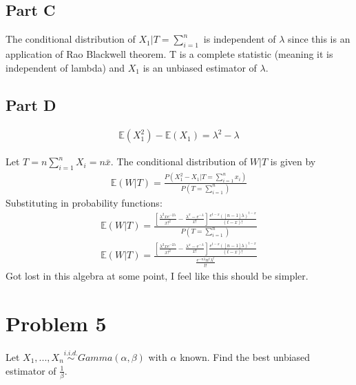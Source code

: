 \documentclass{article}
\begin{document}
\subsection*{Part C}
The conditional distribution of $X_1|T=\sum_{i=1}^{n}$ is independent of $\lambda$ since this is an application of Rao Blackwell theorem. T is a complete statistic (meaning it is independent of lambda) and $X_1$ is an unbiased estimator of $\lambda$.

\subsection*{Part D}
\begin{align*}
\mathbb{E}(X_1^2) - \mathbb{E}(X_1) = \lambda^2 - \lambda
\end{align*}

Let $T=n\sum_{i=1}^{n}X_i=n\bar{x}$. The conditional distribution of $W|T$ is given by
\begin{align*}
\mathbb{E}(W|T) = \frac{P(X_1^2-X_1|T = \sum_{i=1}^{n} x_i)}{P(T=\sum_{i=1}^{n})}
\end{align*}
Substituting in probability functions:
\begin{align*}
\mathbb{E}(W|T) = \frac{[\frac{\lambda^2x e^{-2\lambda}}{x!^2} - \frac{\lambda^x-e^{-\lambda}}{x!}] \frac{e^{t-x}([n-1]\lambda)^{t-x}}{(t-x)!}}{P(T=\sum_{i=1}^{n})} \\
\boxed{ \mathbb{E}(W|T) = \frac{[\frac{\lambda^2x e^{-2\lambda}}{x!^2} - \frac{\lambda^x-e^{-\lambda}}{x!}] \frac{e^{t-x}([n-1]\lambda)^{t-x}}{(t-x)!}}{\frac{e^{-n\lambda}n^t\lambda^t}{t!}} }
\end{align*}
Got lost in this algebra at some point, I feel like this should be simpler.


\clearpage

\section*{Problem 5}
Let $X_1,...,X_n \overset{i.i.d.}{\sim} Gamma(\alpha,\beta)$  with $\alpha$ known. Find the best unbiased estimator of $\frac{1}{\beta}$.
\end{document}
